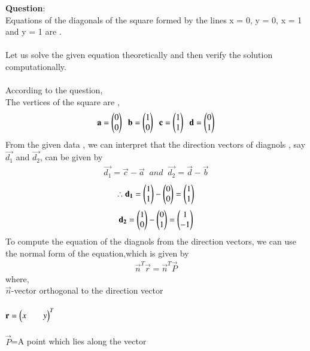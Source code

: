 \documentclass[journal]{IEEEtran}
\begin{document}
\textbf{Question}:\\
Equations of the diagonals of the square formed by the lines x = 0, y = 0, x = 1 and y = 1 are \underline{\hspace{2cm}}.\\
\solution \\
Let us solve the given equation theoretically and then verify the solution computationally.\\
\\
According to the question,\\
The vertices of the square are ,
\begin{align*}
    \mathbf{a}=\begin{pmatrix}0\\0\end{pmatrix}\;\;\mathbf{b}=\begin{pmatrix}1\\0\end{pmatrix}\;\;\mathbf{c}=\begin{pmatrix}1\\1\end{pmatrix}\;\;\mathbf{d}=\begin{pmatrix}0\\1\end{pmatrix}
\end{align*}
From the given data , we can interpret that the direction vectors of diagnols , say $\vec{d_1}$ and $\vec{d_2}$, can be given by 
\begin{align*}
    \vec{d_1}=\vec{c}-\vec{a}\;\;and\;\;\vec{d_2}=\vec{d}-\vec{b}
\end{align*}
\begin{align*}
    \therefore \mathbf{d_1}=\begin{pmatrix}1\\1\end{pmatrix}-\begin{pmatrix}0\\0\end{pmatrix}=\begin{pmatrix}1\\1\end{pmatrix}
\end{align*}
\begin{align*}
    \mathbf{d_2}=\begin{pmatrix}1\\0\end{pmatrix}-\begin{pmatrix}0\\1\end{pmatrix}=\begin{pmatrix}1\\-1\end{pmatrix}
\end{align*}
To compute the equation of the diagnols from the direction vectors, we can use the normal form of the equation,which is given by
\begin{align*}
    \vec{n}^T\vec{r}=\vec{n}^T\vec{P}
\end{align*}
where,\\
\hspace*{4em}  $\vec{n}$-vector orthogonal to the direction vector\\
\\
\hspace*{4em}  $\mathbf{r}=\begin{pmatrix}x&&y\end{pmatrix}^T$ \\
\\
\hspace*{4em}  $\vec{P}$=A point which lies along the vector\\
\end{document}
